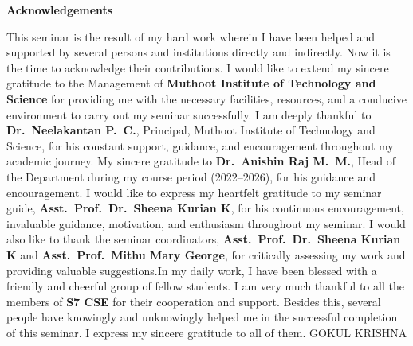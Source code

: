 \begin{center}
    \Large\bfseries Acknowledgements
\end{center}

This seminar is the result of my hard work wherein I have been helped and supported by several persons and institutions directly and indirectly. Now it is the time to acknowledge their contributions.
\newline I would like to extend my sincere gratitude to the Management of \textbf{Muthoot Institute of Technology and Science} for providing me with the necessary facilities, resources, and a conducive environment to carry out my seminar successfully. I am deeply thankful to \textbf{Dr.\ Neelakantan P.\ C.}, Principal, Muthoot Institute of Technology and Science, for his constant support, guidance, and encouragement throughout my academic journey.
My sincere gratitude to \textbf{Dr.\ Anishin Raj M.\ M.}, Head of the Department during my course period (2022--2026), for his guidance and encouragement. \newline I would like to express my heartfelt gratitude to my seminar guide, \textbf{Asst.\ Prof.\ Dr.\ Sheena Kurian K}, for his continuous encouragement, invaluable guidance, motivation, and enthusiasm throughout my seminar. I would also like to thank the seminar coordinators, \textbf{Asst.\ Prof.\ Dr.\ Sheena Kurian K} and \textbf{Asst.\ Prof.\ Mithu Mary George}, for critically assessing my work and providing valuable suggestions.\newline In my daily work, I have been blessed with a friendly and cheerful group of fellow students. I am very much thankful to all the members of \textbf{S7 CSE} for their cooperation and support.
Besides this, several people have knowingly and unknowingly helped me in the successful completion of this seminar. I express my sincere gratitude to all of them.
\vfill %
\hfill %
GOKUL KRISHNA
